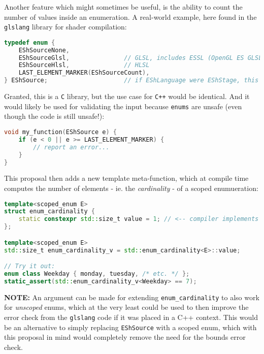 \documentclass[
  format=manuscript,
  screen=true,
  review=false,
  nonacm=true,
  timestamp=true,
  balance=false]{acmart}
\begin{document}
Another feature which might sometimes be useful, is the ability to count the number
of values inside an enumeration. A real-world example, here found in the
\texttt{glslang} library for shader compilation:\vspace{2mm}

\begin{lstlisting}[language=Cpp]
typedef enum {
    EShSourceNone,
    EShSourceGlsl,               // GLSL, includes ESSL (OpenGL ES GLSL)
    EShSourceHlsl,               // HLSL
    LAST_ELEMENT_MARKER(EShSourceCount),
} EShSource;                     // if EShLanguage were EShStage, this could be EShLanguage instead
\end{lstlisting}

Granted, this is a \texttt{C} library, but the use case for \texttt{C++} would be
identical. And it would likely be used for validating the input because \texttt{enums}
are unsafe (even though the code is still unsafe!):\vspace{2mm}

\begin{lstlisting}[language=Cpp]
void my_function(EShSource e) {
    if (e < 0 || e >= LAST_ELEMENT_MARKER) {
        // report an error...
    }
}
\end{lstlisting}


\noindent
This proposal then adds a new template meta-function, which at compile time computes
the number of elements - ie. the \textit{cardinality} - of a scoped enumueration:\vspace{2mm}

\begin{lstlisting}[language=Cpp]
template<scoped_enum E>
struct enum_cardinality {
    static constexpr std::size_t value = 1; // <-- compiler implements this
};

template<scoped_enum E>
std::size_t enum_cardinality_v = std::enum_cardinality<E>::value;

// Try it out:
enum class Weekday { monday, tuesday, /* etc. */ };
static_assert(std::enum_cardinality_v<Weekday> == 7);
\end{lstlisting}

\noindent
\textbf{NOTE:} An argument can be made for extending \texttt{enum\_cardinality}
to also work for \textit{unscoped} enums, which at the very least could be used
to then improve the error check from the \texttt{glslang} code if it was placed
in a C++ context. This would be an alternative to simply replacing
\texttt{EShSource} with a scoped enum, which with this proposal in mind would
completely remove the need for the bounds error check.
\end{document}
